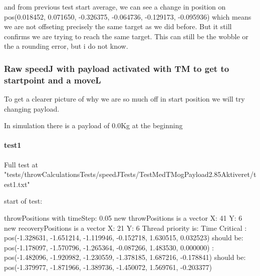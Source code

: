 and from previous test start average, we can see a change in position on pos(0.018452, 0.071650, -0.326375, -0.064736, -0.129173, -0.095936) which means we are not offseting precisely the same target as we did before. \newline 
But it still confirms we are trying to reach the same target. This can still be the wobble or the a rounding error, but i do not know.

\subsubsection{Raw speedJ with payload activated with TM to get to startpoint and a moveL}
To get a clearer picture of why we are so much off in start position we will try changing payload.\newline 

In simulation there is a payload of 0.0Kg at the beginning

\paragraph{test1}
Full test at "tests/throwCalculationsTests/speedJTests/TestMedTMogPayload2.85Aktiveret/test1.txt"\newline 

start of test:\newline 

throwPositions with timeStep:  0.05
\newline new throwPositions is a vector X: 41 Y:  6
\newline new recoveryPositions is a vector X: 21 Y:  6
\newline Thread priority is: Time Critical
\newline [0.000000s - Step 0/41]:
\newline \hspace{1cm}        pos(-1.328631, -1.651214, -1.119946, -0.152718, 1.630515, 0.032523) should be:
\newline \hspace{1cm}        pos(-1.178097, -1.570796, -1.265364, -0.087266, 1.483530, 0.000000)
\newline [2.000000s - Step 40/41]:
\newline \hspace{1cm}        pos(-1.482096, -1.920982, -1.230559, -1.378185, 1.687216, -0.178841) should be:
\newline \hspace{1cm}        pos(-1.379977, -1.871966, -1.389736, -1.450072, 1.569761, -0.203377)\newline 

